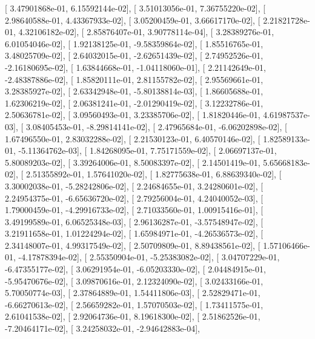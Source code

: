 \documentclass{article}
\begin{document}
       [  3.47901868e-01,   6.15592144e-02],
       [  3.51013056e-01,   7.36755220e-02],
       [  2.98640588e-01,   4.43367933e-02],
       [  3.05200459e-01,   3.66617170e-02],
       [  2.21821728e-01,   4.32106182e-02],
       [  2.85876407e-01,   3.90778114e-04],
       [  3.28389276e-01,   6.01054046e-02],
       [  1.92138125e-01,  -9.58359864e-02],
       [  1.85516765e-01,   3.48025709e-02],
       [  2.64032015e-01,  -2.62651439e-02],
       [  2.74952526e-01,  -2.16180695e-02],
       [  1.63844668e-01,  -1.04118060e-01],
       [  2.21142649e-01,  -2.48387886e-02],
       [  1.85820111e-01,   2.81155782e-02],
       [  2.95569661e-01,   3.28385927e-02],
       [  2.63342948e-01,  -5.80138814e-03],
       [  1.86605688e-01,   1.62306219e-02],
       [  2.06381241e-01,  -2.01290419e-02],
       [  3.12232786e-01,   2.50636781e-02],
       [  3.09560493e-01,   3.23385706e-02],
       [  1.81820446e-01,   4.61987537e-03],
       [  3.08405453e-01,  -8.29814141e-02],
       [  2.47965684e-01,  -6.06202898e-02],
       [  1.67496550e-01,   2.83032288e-02],
       [  2.21530123e-01,   6.40570146e-02],
       [  1.82589133e-01,  -5.11364762e-03],
       [  1.84268095e-01,   7.75171559e-02],
       [  2.06697137e-01,   5.80089203e-02],
       [  3.39264006e-01,   8.50083397e-02],
       [  2.14501419e-01,   5.65668183e-02],
       [  2.51355892e-01,   1.57641020e-02],
       [  1.82775638e-01,   6.88639340e-02],
       [  3.30002038e-01,  -5.28242806e-02],
       [  2.24684655e-01,   3.24280601e-02],
       [  2.24954375e-01,  -6.65636720e-02],
       [  2.79256004e-01,   4.24040052e-03],
       [  1.79000459e-01,  -4.29916733e-02],
       [  2.71033560e-01,   1.00915416e-01],
       [  3.49199589e-01,   6.06525348e-03],
       [  2.96136287e-01,  -3.57548947e-02],
       [  3.21911658e-01,   1.01224294e-02],
       [  1.65984971e-01,  -4.26536573e-02],
       [  2.34148007e-01,   4.99317549e-02],
       [  2.50709809e-01,   8.89438561e-02],
       [  1.57106466e-01,  -4.17878394e-02],
       [  2.55350904e-01,  -5.25383082e-02],
       [  3.04707229e-01,  -6.47355177e-02],
       [  3.06291954e-01,  -6.05203330e-02],
       [  2.04484915e-01,  -5.95470676e-02],
       [  3.09870616e-01,   2.12324090e-02],
       [  3.02433166e-01,   5.70050774e-03],
       [  2.37864889e-01,   1.54411806e-03],
       [  2.52829471e-01,  -6.66270613e-02],
       [  2.56659282e-01,   1.57070503e-02],
       [  1.73411575e-01,   2.61041538e-02],
       [  2.92064736e-01,   8.19618300e-02],
       [  2.51862526e-01,  -7.20464171e-02],
       [  3.24258032e-01,  -2.94642883e-04],
\end{document}
